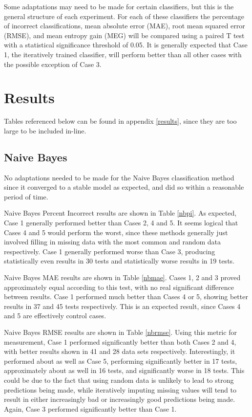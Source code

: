 Some adaptations may need to be made for certain classifiers, but this is the general structure of each experiment. For each of these classifiers the percentage of incorrect classifications, mean absolute error (MAE), root mean squared error (RMSE), and mean entropy gain (MEG) will be compared using a paired T test with a statistical significance threshold of 0.05. It is generally expected that Case 1, the iteratively trained classifier, will perform better than all other cases with the possible exception of Case 3.

\section{Results}

Tables referenced below can be found in appendix \ref{results}, since they are too large to be included in-line.

\subsection{Naive Bayes}
No adaptations needed to be made for the Naive Bayes classification method since it converged to a stable model as expected, and did so within a reasonable period of time.

Naive Bayes Percent Incorrect results are shown in Table \ref{nbpi}. As expected, Case 1 generally performed better than Cases 2, 4 and 5. It seems logical that Cases 4 and 5 would perform the worst, since these methods generally just involved filling in missing data with the most common and random data respectively. Case 1 generally performed worse than Case 3, producing statistically even results in 30 tests and statistically worse results in 19 tests.

Naive Bayes MAE results are shown in Table \ref{nbmae}. Cases 1, 2 and 3 proved approximately equal according to this test, with no real significant difference between results. Case 1 performed much better than Cases 4 or 5, showing better results in 37 and 45 tests respectively. This is an expected result, since Cases 4 and 5 are effectively control cases.

Naive Bayes RMSE results are shown in Table \ref{nbrmse}. Using this metric for measurement, Case 1 performed significantly better than both Cases 2 and 4, with better results shown in 41 and 28 data sets respectively. Interestingly, it performed about as well as Case 5, performing significantly better in 17 tests, approximately about as well in 16 tests, and significantly worse in 18 tests. This could be due to the fact that using random data is unlikely to lead to strong predictions being made, while iteratively imputing missing values will tend to result in either increasingly bad or increasingly good predictions being made. Again, Case 3 performed significantly better than Case 1.

